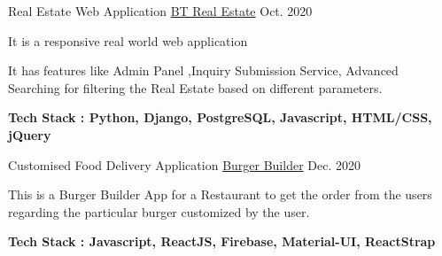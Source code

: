 \begin{cventries}
  \cventry
    {Real Estate Web Application} %
    {\href{https://real-estate-12-04.herokuapp.com/}{BT Real Estate}} %
    {} %
    {Oct. 2020} %
    {
      \begin{cvitems} %
        \item {It is a responsive real world web application}
        \item {It has features like Admin Panel ,Inquiry Submission Service, Advanced Searching for filtering the Real Estate based on different parameters.}
        \item {\textbf{Tech Stack : Python, Django, PostgreSQL, Javascript, HTML/CSS, jQuery}}
      \end{cvitems}
    }


 \cventry
    {Customised Food Delivery Application} %
    {\href{https://app-burger-124.web.app/sign-in}{Burger Builder}} %
    {} %
    {Dec. 2020} %
    {
      \begin{cvitems} %
        \item {This is a Burger Builder App for a Restaurant to get the order from the users regarding the particular burger customized by the user.}
        \item {\textbf{Tech Stack : Javascript, ReactJS, Firebase, Material-UI, ReactStrap}}
      \end{cvitems}
    } 

\end{cventries}

